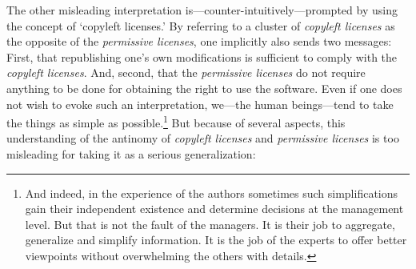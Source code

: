 The other misleading interpretation is---counter-intuitively---prompted by using
the concept of `copyleft licenses.' By referring to a cluster of \emph{copyleft
licenses} as the opposite of the \emph{permissive licenses}, one implicitly also
sends two messages: First, that republishing one's own modifications is
sufficient to comply with the \emph{copyleft licenses}. And, second, that the
\emph{permissive licenses} do not require anything to be done for obtaining the
right to use the software. Even if one does not wish to evoke such an
interpretation, we---the human beings---tend to take the things as simple as
possible.\footnote{And indeed, in the experience of the authors sometimes
such simplifications gain their independent existence and determine decisions at
the management level. But that is not the fault of the managers. It is their
job to aggregate, generalize and simplify information. It is the job of the
experts to offer better viewpoints without overwhelming the others with
details.} But because of several aspects, this understanding of the antinomy of
\emph{copyleft licenses} and \emph{permissive licenses} is too misleading for
taking it as a serious generalization:

